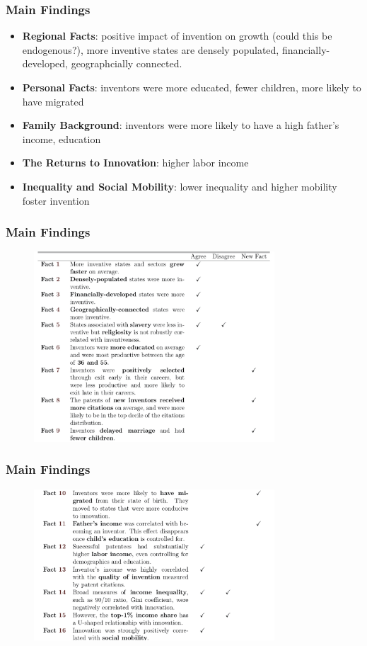 \documentclass[aspectratio=169, 12pt, final]{beamer}
\begin{document}
\begin{frame}
\frametitle{Main Findings}
\begin{itemize}
	\item \textbf{Regional Facts}: positive impact of invention on growth (could this be endogenous?), more inventive states are densely populated, financially-developed, geographcially connected.
	\item \textbf{Personal Facts}: inventors were more educated, fewer children, more likely to have migrated
	\item \textbf{Family Background}: inventors were more likely to have a high father's income, education
	\item \textbf{The Returns to Innovation}: higher labor income
	\item \textbf{Inequality and Social Mobility}: lower inequality and higher mobility foster invention
\end{itemize}
\end{frame}
\fi

\begin{frame}
\frametitle{Main Findings}
\begin{figure}
\includegraphics[width=9cm]{W1_Table19_part1.jpeg}
\end{figure}
\end{frame}
\begin{frame}
\frametitle{Main Findings}
\begin{figure}
\includegraphics[width=9cm]{W1_Table19_part2.jpeg}
\end{figure}
\end{frame}
\end{document}
